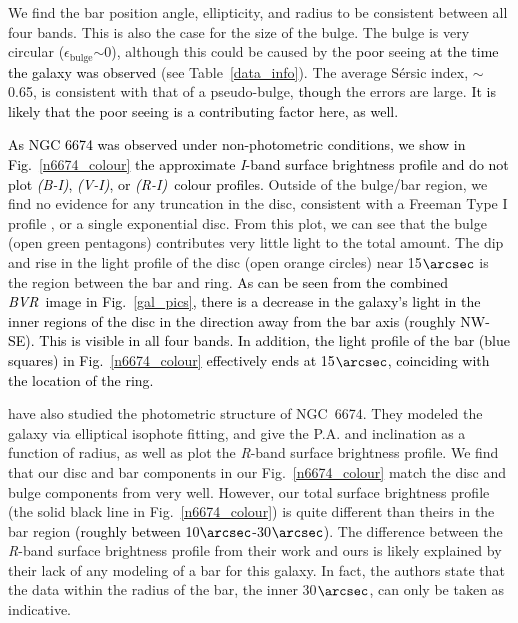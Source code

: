\documentclass[a4paper,fleqn,usenatbib]{mnras}
\newcommand{\authorfix}{\textcolor{black}}
\begin{document}
We find the bar position angle, ellipticity, and radius to be consistent between all four bands. This is also the case for the size of the bulge. The bulge is very circular ($\epsilon_{\mathrm{bulge}}$$\sim$0), although this could be caused by the \authorfix{poor} seeing \authorfix{at the time the galaxy was observed} (see Table~\ref{data_info}). The average S\'{e}rsic index, $\sim$0.65, is consistent with that of a pseudo-bulge, \authorfix{though} the errors are large. \authorfix{It is likely that the poor seeing is a contributing factor here, as well.}

\authorfix{As NGC 6674 was observed under non-photometric conditions, we show in Fig.~\ref{n6674_colour} the approximate \textit{I}-band surface brightness profile and do not plot \textit{(B-I)}, \textit{(V-I)}, or \textit{(R-I)}\ colour profiles.} Outside of the bulge/bar region, we find no evidence for any truncation in the disc, consistent with a Freeman Type I profile \citep{freeman1970}, or a single exponential disc. From this plot, we can see that the bulge (open green pentagons) contributes very little light to the total amount. The dip and rise in the light profile of the disc (open orange circles) near 15$\arcsec$ is the region between the bar and ring. \authorfix{As can be seen from the combined \textit{BVR}\ image in Fig.~\ref{gal_pics}, there is a decrease in the galaxy's light in the inner regions of the disc in the direction away from the bar axis (roughly NW-SE). This is visible in all four bands. In addition, the light profile of the bar (blue squares) in Fig.~\ref{n6674_colour} effectively ends at 15$\arcsec$, coinciding with the location of the ring.}

\citet{boreils1991} have also studied the photometric structure of NGC~6674.  They modeled the galaxy via elliptical isophote fitting, and give the P.A. and inclination as a function of radius, as well as plot the \textit{R}-band surface brightness profile. We find that our disc and bar components in our Fig.~\ref{n6674_colour} match the disc and bulge components from \citet{boreils1991} very well. However, our total surface brightness profile (the solid black line in Fig.~\ref{n6674_colour}) is quite different than theirs in the bar region \authorfix{(roughly between 10$\arcsec$-30$\arcsec$)}. The difference between the \textit{R}-band surface brightness profile from their work and ours is likely explained by their lack of any modeling of a bar for this galaxy. In fact, the authors state that the data within the radius of the bar, the inner 30$\arcsec$, can only be taken as indicative. 
\end{document}
